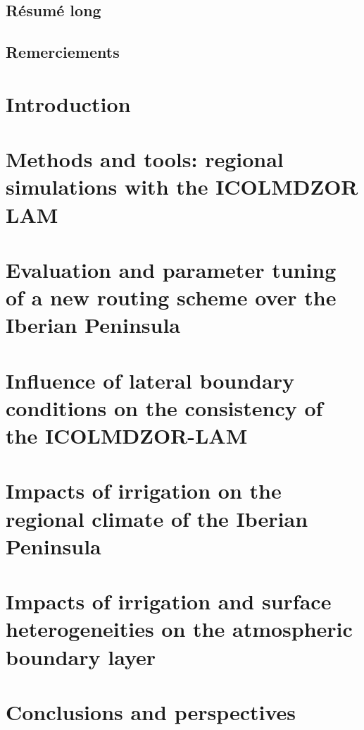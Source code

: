 \documentclass{report}
\begin{document}
\clearpage

\section*{Résumé long}
\section*{Remerciements}

\clearpage
\dominitoc
\renewcommand*\contentsname{Contents}
\tableofcontents
\newpage

\chapter{Introduction}
\label{chap:introduction}
\minitoc
\pagebreak


\chapter{Methods and tools: regional simulations with the ICOLMDZOR LAM}
\label{chap:methods}
\minitoc
\pagebreak


\chapter{Evaluation and parameter tuning of a new routing scheme over the Iberian Peninsula}
\label{chap:routing}
\minitoc
\pagebreak


\chapter{Influence of lateral boundary conditions on the consistency of the ICOLMDZOR-LAM}
\label{chap:forcing}
\minitoc
\pagebreak


\chapter{Impacts of irrigation on the regional climate of the Iberian Peninsula}
\label{chap:monthly}
\minitoc
\pagebreak


\chapter{Impacts of irrigation and surface heterogeneities on the atmospheric boundary layer}
\label{chap:liaise}
\minitoc
\pagebreak


\chapter{Conclusions and perspectives}
\label{chap:conclusion}
\minitoc
\pagebreak




\newpage

\printbibliography

\listoffigures
\newpage
\listoftables
\end{document}
